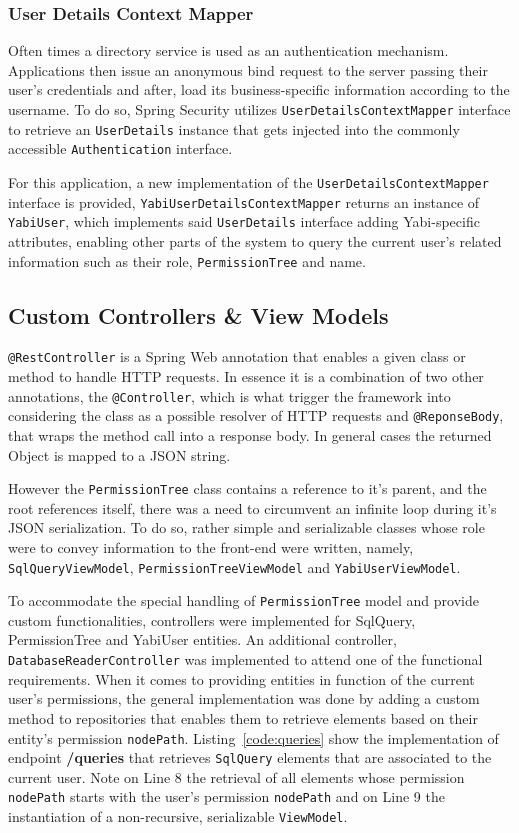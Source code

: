 \subsubsection{User Details Context Mapper}\label{impl:detailsmapper}
Often times a directory service is used as an authentication mechanism. Applications then issue an anonymous bind request to the server passing their user's credentials and after, load its business-specific information according to the username. To do so, Spring Security utilizes \texttt{UserDetailsContextMapper} interface to retrieve an \texttt{UserDetails} instance that gets injected into the commonly accessible \texttt{Authentication} interface.

For this application, a new implementation of the \texttt{UserDetailsContextMapper} interface is provided, \texttt{YabiUserDetailsContextMapper} returns an instance of \texttt{YabiUser}, which implements said \texttt{UserDetails} interface adding \gls{Yabi}-specific attributes, enabling other parts of the system to query the current user's related information such as their role, \texttt{PermissionTree} and name.

\subsection{Custom Controllers \& View Models}\label{s:ccevm}
\texttt{@RestController} is a Spring Web annotation that enables a given class or method to handle \gls{HTTP} requests. In essence it is a combination of two other annotations, the \texttt{@Controller}, which is what trigger the framework into considering the class as a possible resolver of  \gls{HTTP} requests and \texttt{@ReponseBody}, that wraps the method call into a response body. In general cases the returned Object is mapped to a \gls{JSON} string.

However the \texttt{PermissionTree} class contains a reference to it's parent, and the root references itself, there was a need to circumvent an infinite loop during it's \gls{JSON} serialization. To do so, rather simple and 
serializable classes whose role were to convey information to the front-end were written, namely, \texttt{SqlQueryViewModel}, \texttt{PermissionTreeViewModel} and \texttt{YabiUserViewModel}.

To accommodate the special handling of \texttt{PermissionTree} model and provide custom functionalities, controllers were implemented for SqlQuery, PermissionTree and YabiUser entities.  An additional controller, \texttt{DatabaseReaderController} was implemented to attend one of the functional requirements. When it comes to providing entities in function of the current user's permissions, the general implementation was done by adding a custom method to repositories that enables them to retrieve elements based on their entity's permission \texttt{nodePath}. Listing~\ref{code:queries} show the implementation of endpoint \textbf{/queries} that retrieves \texttt{SqlQuery} elements that are associated to the current user. Note on Line 8 the retrieval of all elements whose permission \texttt{nodePath} starts with the user's permission \texttt{nodePath} and on Line 9 the instantiation of a non-recursive, serializable \texttt{ViewModel}.

